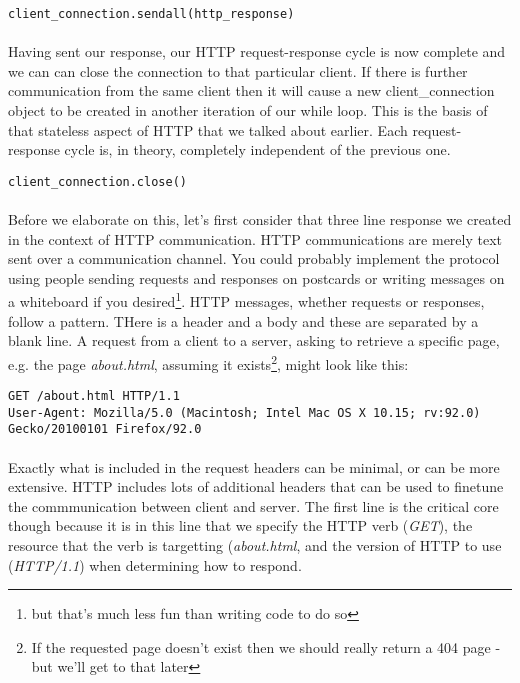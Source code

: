 \begin{lstlisting}[style=CODE]
client_connection.sendall(http_response)
\end{lstlisting}

\paragraph{} Having sent our response, our HTTP request-response cycle is now complete and we can can close the connection to that particular client. If there is further communication from the same client then it will cause a new client\_connection object to be created in another iteration of our while loop. This is the basis of that stateless aspect of HTTP that we talked about earlier. Each request-response cycle is, in theory, completely independent of the previous one.

\begin{lstlisting}[style=CODE]
client_connection.close()
\end{lstlisting}


\paragraph{} Before we elaborate on this, let's first consider that three line response we created in the context of HTTP communication. HTTP communications are merely text sent over a communication channel. You could probably implement the protocol using people sending requests and responses on postcards or writing messages on a whiteboard if you desired\footnote{but that's much less fun than writing code to do so}. HTTP messages, whether requests or responses, follow a pattern. THere is a header and a body and these are separated by a blank line. A request from a client to a server, asking to retrieve a specific page, e.g. the page \emph{about.html}, assuming it exists\footnote{If the requested page doesn't exist then we should really return a 404 page - but we'll get to that later}, might look like this:

\begin{lstlisting}[style=DOS]
GET /about.html HTTP/1.1
User-Agent: Mozilla/5.0 (Macintosh; Intel Mac OS X 10.15; rv:92.0) Gecko/20100101 Firefox/92.0
\end{lstlisting}

\paragraph{} Exactly what is included in the request headers can be minimal, or can be more extensive. HTTP includes lots of additional headers that can be used to finetune the commmunication between client and server. The first line is the critical core though because it is in this line that we specify the HTTP verb (\emph{GET}), the resource that the verb is targetting (\emph{about.html}, and the version of HTTP to use (\emph{HTTP/1.1}) when determining how to respond.


